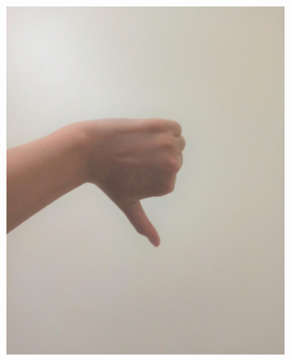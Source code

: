 \documentclass[conference]{IEEEtran}
\begin{document}
\begin{figure} [h]
\begin{center}
\begin{subfigure}[t]{0.11\textwidth}
			\includegraphics[width=\textwidth]{img/pola8a.jpg}
			\caption{\label{fig:gs8a}}
		\end{subfigure}
		\hspace{0.1em}
		\begin{subfigure}[t]{0.11\textwidth}
			\centering

\end{subfigure}
\end{center}
\end{figure}
\end{document}
